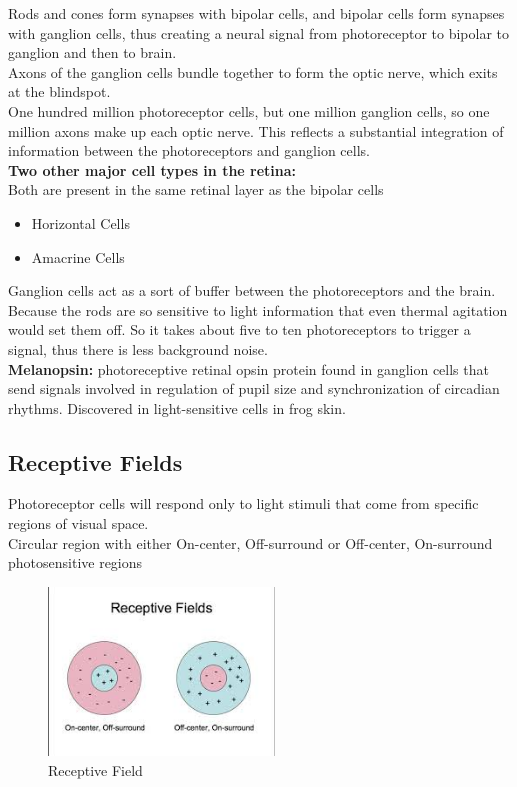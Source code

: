 \documentclass{article}
\begin{document}
Rods and cones form synapses with bipolar cells, and bipolar cells form synapses with ganglion cells, thus creating a neural signal from photoreceptor to bipolar to ganglion and then to brain. \\
\indent Axons of the ganglion cells bundle together to form the optic nerve, which exits at the blindspot. \\

One hundred million photoreceptor cells, but one million ganglion cells, so one million axons make up each optic nerve. This reflects a substantial integration of information between the photoreceptors and ganglion cells. \\

\noindent \textbf{Two other major cell types in the retina:} \\
Both are present in the same retinal layer as the bipolar cells
\begin{itemize}
    \item Horizontal Cells
    \item Amacrine Cells
\end{itemize}

Ganglion cells act as a sort of buffer between the photoreceptors and the brain. Because the rods are so sensitive to light information that even thermal agitation would set them off. So it takes about five to ten photoreceptors to trigger a signal, thus there is less background noise. \\

\textbf{Melanopsin:} photoreceptive retinal opsin protein found in ganglion cells that send signals involved in regulation of pupil size and synchronization of circadian rhythms. Discovered in light-sensitive cells in frog skin. 

\subsection{Receptive Fields}
Photoreceptor cells will respond only to light stimuli that come from specific regions of visual space. \\
Circular region with either On-center, Off-surround or Off-center, On-surround photosensitive regions \\

\begin{figure}[htp]
\centering
\includegraphics[width=6cm]{images/rf.jpg}
\caption{Receptive Field}
\label{fig: RF}
\end{figure}
\end{document}
